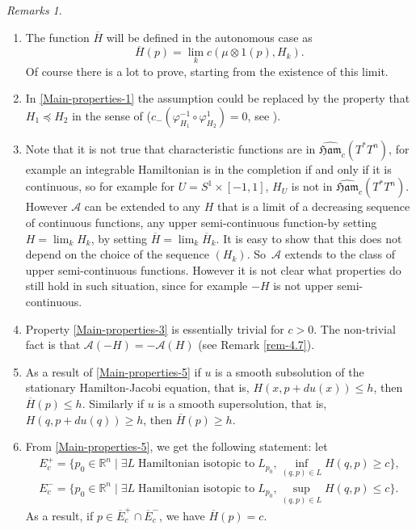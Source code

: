 \documentclass[JEP,XML,SOM,NoFloatCountersInSection,Unicode,published]{cedram}
\numberwithin{equation}{section}
\newcommand {\Ham}{{\mathfrak {Ham}}}
\newcommand{\gclHamc}[1]{\widehat{\Ham}_c(#1)}
\theoremstyle{plain}
\theoremstyle{definition}
\theoremstyle{remark}
\newtheorem{remarks}[theorem]{Remarks}
\begin{document}
\begin{remarks}\label{rem-4.3} \begin{enumerate}
Here are some comments:
\item The function $\overline H$ will be defined in the autonomous case as
\[
\overline H(p)=\lim_k c(\mu\otimes 1(p), H_k).
\]
Of course there is a lot to prove, starting from the existence of this limit.

\item In \eqref{Main-properties-1} the assumption could be replaced by the property that $H_1 \preceq H_2$ in the sense of \cite{Viterbo-STAGGF} (\ie $c_{-}(\varphi_{H_{1}}^{-1}\circ \varphi_{H_{2}}^1)=0$, see \cite[Def.\,4.9, p.\,701]{Viterbo-STAGGF}).
\item \label{rem-4.3-3} Note that it is not true that characteristic functions are in $\gclHamc{ T^{*} T^{n}}$, for example an integrable Hamiltonian is in the completion if and only if it is continuous, so
for example for $U=S^1\times [-1,1]$, $H_U$ is not in $\gclHamc{ T^{*} T^{n}}$. However $\mathcal A$ can be extended to any $H$ that is a limit of a decreasing sequence of continuous functions, \ie any upper semi-continuous function-by setting $H=\lim_{k} H_k$, by setting $\overline H= \lim_{k} \overline H_k$. It is easy to show that this does not depend on the choice of the sequence $(H_k)$. So~$\mathcal A$ extends to the class of upper semi-continuous functions. However it is not clear what properties do still hold in such situation, since for example $-H$ is not upper semi-continuous.

\item Property \ref{Main-properties-3} is essentially trivial for $c>0$. The non-trivial fact is that $\mathcal A (-H)= - \mathcal A(H)$ (see Remark \ref{rem-4.7}).
\item As a result of \ref{Main-properties-5} if
$u$ is a smooth subsolution of the stationary Hamilton-Jacobi equation, that is, $H(x, p+du(x))\leq h$, then $\overline H (p) \leq h$. Similarly if $u$ is a smooth supersolution, that is, $H(q,p+du(q))\geq h$, then
$\overline H(p) \geq h$.
\item From \ref{Main-properties-5}, we get the following statement: let
\begin{align*}
E_{c}^+=\{p_{0} \in {\mathbb R}^n \mid \exists L \; \text{Hamiltonian isotopic to}\; L_{p_{0}},\textstyle \inf_{(q,p)\in L} H(q,p)\geq c\},\\
E_{c}^{-}=\{p_{0} \in {\mathbb R}^n \mid \exists L \; \text{Hamiltonian isotopic to}\; L_{p_{0}}, \textstyle\sup_{(q,p)\in L} H(q,p)\leq c\}.
\end{align*}
As a result, if $p \in \overline E_{c}^{+} \cap \overline E_{c}^{-}$, we have $\overline H(p)=c$.
\end{enumerate}
\end{remarks}
\end{document}
